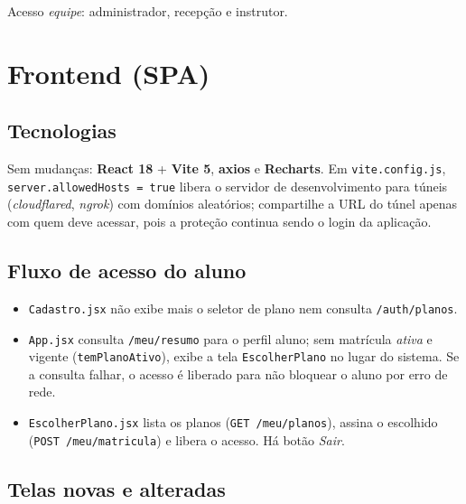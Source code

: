 \documentclass[11pt,a4paper]{article}
\newcommand{\cod}[1]{\texttt{#1}}
\begin{document}
Acesso \textit{equipe}: administrador, recepção e instrutor.

\section{Frontend (SPA)}

\subsection{Tecnologias}

Sem mudanças: \textbf{React 18} + \textbf{Vite 5}, \textbf{axios} e \textbf{Recharts}.
Em \cod{vite.config.js}, \cod{server.allowedHosts = true} libera o servidor de desenvolvimento para
túneis (\textit{cloudflared}, \textit{ngrok}) com domínios aleatórios; compartilhe a URL do túnel
apenas com quem deve acessar, pois a proteção continua sendo o login da aplicação.

\subsection{Fluxo de acesso do aluno}

\begin{itemize}
  \item \cod{Cadastro.jsx} não exibe mais o seletor de plano nem consulta \cod{/auth/planos}.
  \item \cod{App.jsx} consulta \cod{/meu/resumo} para o perfil aluno; sem matrícula \textit{ativa}
        e vigente (\cod{temPlanoAtivo}), exibe a tela \cod{EscolherPlano} no lugar do sistema.
        Se a consulta falhar, o acesso é liberado para não bloquear o aluno por erro de rede.
  \item \cod{EscolherPlano.jsx} lista os planos (\cod{GET /meu/planos}), assina o escolhido
        (\cod{POST /meu/matricula}) e libera o acesso. Há botão \textit{Sair}.
\end{itemize}

\subsection{Telas novas e alteradas}
\end{document}
